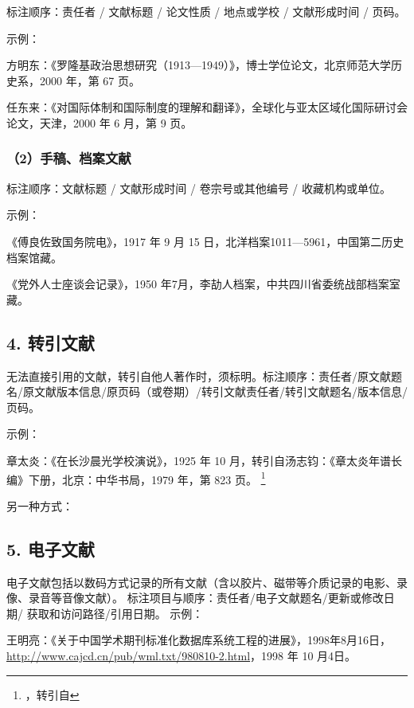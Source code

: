 \documentclass{article}
\begin{document}
标注顺序：责任者 / 文献标题 / 论文性质 / 地点或学校 / 文献形成时间 / 页码。

示例：

方明东：《罗隆基政治思想研究（1913—1949）》，博士学位论文，北京师范大学历史系，2000 年，第 67 页。

任东来：《对国际体制和国际制度的理解和翻译》，全球化与亚太区域化国际研讨会论文，天津，2000 年 6 月，第 9 页。

\subsubsection*{（2）手稿、档案文献}

标注顺序：文献标题 / 文献形成时间 / 卷宗号或其他编号 / 收藏机构或单位。

示例：

《傅良佐致国务院电》，1917 年 9 月 15 日，北洋档案1011—5961，中国第二历史档案馆藏。

《党外人士座谈会记录》，1950 年7月，李劼人档案，中共四川省委统战部档案室藏。


\subsection*{ 4. 转引文献}

无法直接引用的文献，转引自他人著作时，须标明。标注顺序：责任者/原文献题名/原文献版本信息/原页码（或卷期）/转引文献责任者/转引文献题名/版本信息/页码。

示例：

章太炎：《在长沙晨光学校演说》，1925 年 10 月，转引自汤志钧：《章太炎年谱长编》下册，北京：中华书局，1979 年，第 823 页。
\footnote{，转引自}

另一种方式：


\subsection*{5. 电子文献}

电子文献包括以数码方式记录的所有文献（含以胶片、磁带等介质记录的电影、录像、录音等音像文献）。
标注项目与顺序：责任者/电子文献题名/更新或修改日期/ 获取和访问路径/引用日期。
示例：

王明亮：《关于中国学术期刊标准化数据库系统工程的进展》，1998年8月16日， \url{http://www.cajcd.cn/pub/wml.txt/980810-2.html}，1998 年 10 月4日。 
\end{document}
